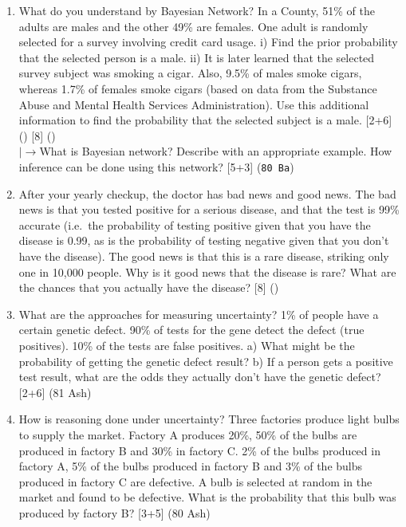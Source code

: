 \documentclass[12pt]{article}
\newcommand{\lb}{\\$\left|\rightarrow\right.$}
\begin{document}
\begin{enumerate}[topsep=0pt, noitemsep]
      \item What do you understand by Bayesian Network? In a County, 51\% of the adults are males and the other 49\% are females. One adult is randomly selected for a survey involving credit card usage. i) Find the prior probability that the selected person is a male. ii) It is later learned that the selected survey subject was smoking a cigar. Also, 9.5\% of males smoke cigars, whereas 1.7\% of females smoke cigars (based on data from the Substance Abuse and Mental Health Services Administration). Use this additional information to find the probability that the selected subject is a male. \hfill [2+6] () [8] ()
        \lb What is Bayesian network? Describe with an appropriate example. How inference can be done using this network? \hfill [5+3] (\texttt{80 Ba})

      \item After your yearly checkup, the doctor has bad news and good news. The bad news is that you tested positive for a serious disease, and that the test is 99\% accurate (i.e.\ the probability of testing positive given that you have the disease is 0.99, as is the probability of testing negative given that you don't have the disease). The good news is that this is a rare disease, striking only one in 10,000 people. Why is it good news that the disease is rare? What are the chances that you actually have the disease? \hfill [8] ()

      \item What are the approaches for measuring uncertainty? 1\% of people have a certain genetic defect. 90\% of tests for the gene detect the defect (true positives). 10\% of the tests are false positives. a) What might be the probability of getting the genetic defect result? b) If a person gets a positive test result, what are the odds they actually don't have the genetic defect? \hfill [2+6] (81 Ash)

      \item How is reasoning done under uncertainty? Three factories produce light bulbs to supply the market. Factory A produces 20\%, 50\% of the bulbs are produced in factory B and 30\% in factory C. 2\% of the bulbs produced in factory A, 5\% of the bulbs produced in factory B and 3\% of the bulbs produced in factory C are defective. A bulb is selected at random in the market and found to be defective. What is the probability that this bulb was produced by factory B? \hfill [3+5] (80 Ash)


\end{enumerate}
\end{document}
